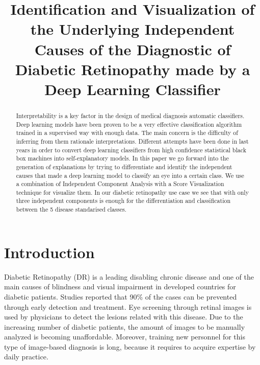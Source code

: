 \documentclass{llncs}
\begin{document}
\title{Identification and Visualization of the Underlying Independent Causes of the Diagnostic of Diabetic Retinopathy made by a Deep Learning Classifier}
\maketitle
%
		
\begin{abstract}
Interpretability is a key factor in the design of medical diagnosis automatic classifiers. Deep learning models have been proven to be a very effective classification algorithm trained in a supervised way with enough data. The main concern is the difficulty of inferring from them rationale interpretations. Different attempts have been done in last years in order to convert deep learning classifiers from high confidence statistical black box machines into self-explanatory models. In this paper we go forward into the generation of explanations by trying to differentiate and identify the independent causes that made a deep learning model to classify an eye into a certain class. We use a combination of Independent Component Analysis with a Score Visualization technique for visualize them. In our diabetic retinopathy use case we see that with only three independent components is enough for the differentiation and classification between the 5 disease standarised classes.
\end{abstract}
	

\section{Introduction}

Diabetic Retinopathy (DR) is a leading disabling chronic disease  and  one of the main causes of blindness and visual impairment in developed countries for diabetic patients. Studies reported that 90\% of the cases can be prevented through early detection and treatment. Eye screening through retinal images is used by physicians to detect the lesions related with this disease. Due to the increasing number of diabetic patients, the amount of images to be manually analyzed is becoming unaffordable. Moreover, training new personnel for this type of image-based diagnosis is long, because it requires to acquire expertise by daily practice. 
\end{document}
